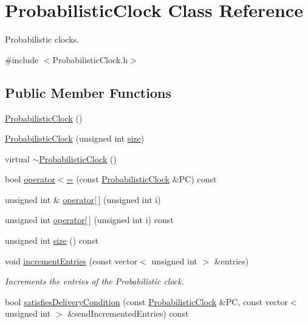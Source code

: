 \hypertarget{class_probabilistic_clock}{}\section{Probabilistic\+Clock Class Reference}
\label{class_probabilistic_clock}


Probabilistic clocks.  




{\ttfamily \#include $<$Probabilistic\+Clock.\+h$>$}

\subsection*{Public Member Functions}
\begin{DoxyCompactItemize}
\item 
\hyperlink{class_probabilistic_clock_aa879f0e457bc70644b6e4f2114215987}{Probabilistic\+Clock} ()
\item 
\hyperlink{class_probabilistic_clock_ab356688e8403176b4211349cba56b9b1}{Probabilistic\+Clock} (unsigned int \hyperlink{class_probabilistic_clock_ad0cdbd2ad50309fae0665df4ee5247ba}{size})
\item 
virtual \hyperlink{class_probabilistic_clock_a11743513addcaaa0d8f0b0d0c74ae2ae}{$\sim$\+Probabilistic\+Clock} ()
\item 
bool \hyperlink{class_probabilistic_clock_a071b29d8c7ebb91528db4739a846dc71}{operator$<$=} (const \hyperlink{class_probabilistic_clock}{Probabilistic\+Clock} \&PC) const
\item 
unsigned int \& \hyperlink{class_probabilistic_clock_a349a0bcb8c21b89c3e6b30b043f16936}{operator\mbox{[}$\,$\mbox{]}} (unsigned int i)
\item 
unsigned int \hyperlink{class_probabilistic_clock_a28398d6b8c5a92b73a7d6260e3f3e7e1}{operator\mbox{[}$\,$\mbox{]}} (unsigned int i) const
\item 
unsigned int \hyperlink{class_probabilistic_clock_ad0cdbd2ad50309fae0665df4ee5247ba}{size} () const
\item 
void \hyperlink{class_probabilistic_clock_a5c510e2d21bc580468c491a71382a4d4}{increment\+Entries} (const vector$<$ unsigned int $>$ \&entries)
\begin{DoxyCompactList}\small\item\em Increments the entries of the Probabilistic clock. \end{DoxyCompactList}\item 
bool \hyperlink{class_probabilistic_clock_a56bced001a856aa04168d787cc2dd549}{satisfies\+Delivery\+Condition} (const \hyperlink{class_probabilistic_clock}{Probabilistic\+Clock} \&PC, const vector$<$ unsigned int $>$ \&send\+Incremented\+Entries) const

\end{DoxyCompactItemize}

